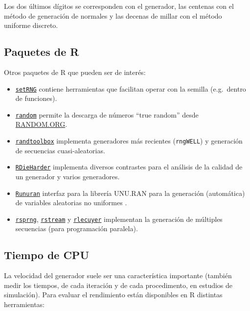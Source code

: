 \documentclass[
  spanish,
  10pt,
]{book}
\theoremstyle{break}
\theoremstyle{nonumberplain}
\begin{document}
Los dos últimos dígitos se corresponden con el generador, las centenas con el método de generación de normales y las decenas de millar con el método uniforme discreto.

\subsection{Paquetes de R}\label{paquetes-de-r}

Otros paquetes de R que pueden ser de interés:

\begin{itemize}
\item
  \href{https://CRAN.R-project.org/package=setRNG}{\texttt{setRNG}} contiene herramientas que facilitan operar con la semilla
  (e.g.~dentro de funciones).
\item
  \href{https://CRAN.R-project.org/package=random}{\texttt{random}} permite la descarga de números ``true random'' desde
  \href{https://www.random.org}{RANDOM.ORG}.
\item
  \href{https://CRAN.R-project.org/package=randtoolbox}{\texttt{randtoolbox}} implementa generadores más recientes (\texttt{rngWELL}) y
  generación de secuencias cuasi-aleatorias.
\item
  \href{https://CRAN.R-project.org/package=RDieHarder}{\texttt{RDieHarder}} implementa diversos contrastes para el análisis de la
  calidad de un generador y varios generadores.
\item
  \href{https://CRAN.R-project.org/package=Runuran}{\texttt{Runuran}} interfaz para la librería UNU.RAN para la generación
  (automática) de variables aleatorias no uniformes \citep[ver][]{hormann2004}.
\item
  \href{https://CRAN.R-project.org/package=rsprng}{\texttt{rsprng}}, \href{https://CRAN.R-project.org/package=rstream}{\texttt{rstream}} y \href{https://CRAN.R-project.org/package=rlecuyer}{\texttt{rlecuyer}} implementan
  la generación de múltiples secuencias (para programación paralela).
\end{itemize}

\subsection{Tiempo de CPU}\label{tiempo-de-cpu}

La velocidad del generador suele ser una característica importante (también medir los tiempos, de cada iteración y de cada procedimento, en estudios de simulación).
Para evaluar el rendimiento están disponibles en R distintas herramientas:
\end{document}
